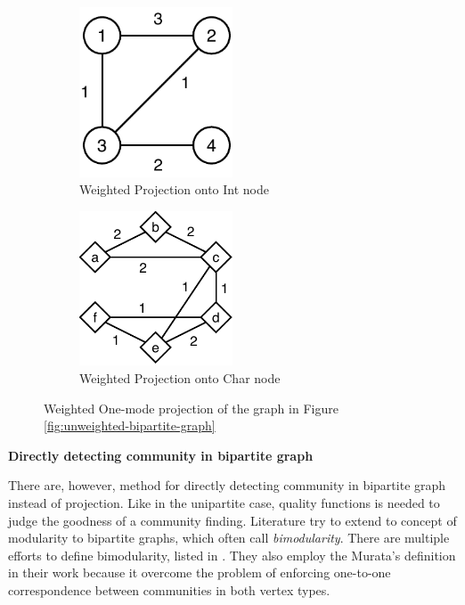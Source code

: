 \begin{figure}[H]
	\centering
	\begin{subfigure}[b]{0.4\textwidth}
		\centering
		\includegraphics[width=0.5\textwidth]{images/weighted-bipartite-projection-number.pdf}
		\caption{Weighted Projection onto Int node}
		\label{fig:WeightedIntprojection}
	\end{subfigure}
	\begin{subfigure}[b]{0.4\textwidth}
		\centering
		\includegraphics[width=0.5\textwidth]{images/weighted-bipartite-projection-char.pdf}
		\caption{Weighted Projection onto Char node}
		\label{fig:WeightedCharprojection}
	\end{subfigure}
	\caption{Weighted One-mode projection of the graph in Figure \ref{fig:unweighted-bipartite-graph}}
	\label{fig:Weightedprojection}
\end{figure}

\textbf{Directly detecting community in bipartite graph}

There are, however, method for directly detecting community in bipartite graph instead of projection.
Like in the unipartite case, quality functions is needed to judge the goodness of a community finding.
Literature try to extend to concept of modularity to bipartite graphs, which often call \textit{bimodularity}.
There are multiple efforts to define bimodularity, listed in \parencite{pesantez2018}.
They also employ the Murata's definition \parencite{murata2009} in their work because
it overcome the problem of enforcing one-to-one correspondence between communities in both vertex types.


